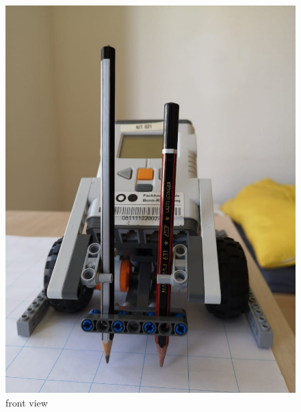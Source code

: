 \documentclass[11pt,a4paper]{article}
\begin{document}
\begin{figure}[H]
\centering
  \centering
  \includegraphics[width=0.8\linewidth]{front}
  \caption{front view}
  \label{fig:front}
\end{figure}

\newpage
\end{document}
